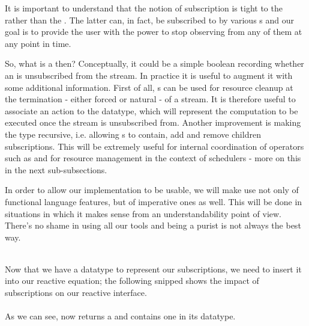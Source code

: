 It is important to understand that the notion of subscription is tight to the  rather than the . The latter can, in fact, be subscribed to by various s and our goal is to provide the user with the power to stop observing from any of them at any point in time.

So, what is a  then? Conceptually, it could be a simple boolean recording whether an  is unsubscribed from the stream. In practice it is useful to augment it with some additional information. First of all, s can be used for resource cleanup at the termination - either forced or natural - of a stream. It is therefore useful to associate an  action to the datatype, which will represent the computation to be executed once the stream is unsubscribed from. Another improvement is making the type recursive, i.e. allowing s to contain, add and remove children subscriptions. This will be extremely useful for internal coordination of operators such as \code{(>>=)} and for resource management in the context of schedulers - more on this in the next sub-subsections.

In order to allow our implementation to be usable, we will make use not only of functional language features, but of imperative ones as well. This will be done in situations in which it makes sense from an understandability point of view. There's no shame in using all our tools and being a purist is not always the best way.



\\

Now that we have a datatype to represent our subscriptions, we need to insert it into our reactive equation; the following snipped shows the impact of subscriptions on our reactive interface.\\

\\

As we can see,  now returns a  and  contains one in its datatype.

